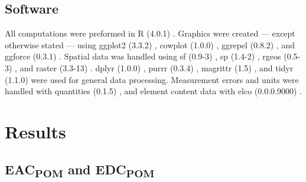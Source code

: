 \documentclass[alpha-refs, lineno]{wiley-article-rmd}
\begin{document}
\hypertarget{software}{%
\subsection{Software}\label{software}}

All computations were preformed in R (4.0.1) \autocite{RCoreTeam.2020}. Graphics were created --- except otherwise stated --- using ggplot2 (3.3.2) \autocite{Wickham.2016}, cowplot (1.0.0) \autocite{Wilke.2019}, ggrepel (0.8.2) \autocite{Slowikowski.2020}, and ggforce (0.3.1) \autocite{Pedersen.2019}. Spatial data was handled using sf (0.9-3) \autocite{Pebesma.2018b}, sp (1.4-2) \autocite{Pebesma.2005}, rgeos (0.5-3) \autocite{Bivand.2020}, and raster (3.3-13) \autocite{Hijmans.2020}. dplyr (1.0.0) \autocite{Wickham.2020e}, purrr (0.3.4) \autocite{Henry.2020}, magrittr (1.5) \autocite{Bache.2014}, and tidyr (1.1.0) \autocite{Wickham.2020f} were used for general data processing. Measurement errors and units were handled with quantities (0.1.5) \autocite{Pebesma.2016,Ucar.2019}, and element content data with elco (0.0.0.9000) \autocite{Teickner.2020e}.

\hypertarget{results}{%
\section{Results}\label{results}}

\hypertarget{eac-and-edc}{%
\subsection{\texorpdfstring{EAC\textsubscript{POM} and EDC\textsubscript{POM}}{EAC and EDC}}\label{eac-and-edc}}
\end{document}

